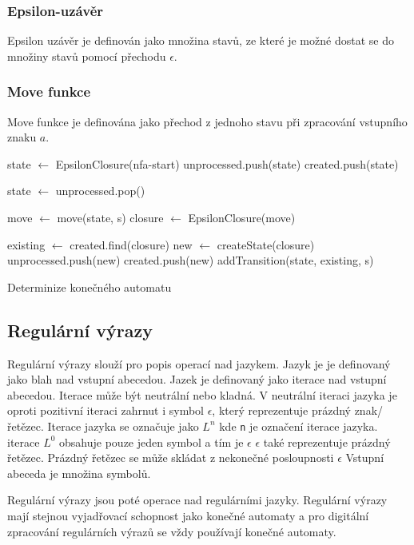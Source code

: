 \subsubsection{Epsilon-uzávěr} %
Epsilon uzávěr je definován jako množina stavů, ze které je možné dostat se do množiny stavů pomocí přechodu
$\epsilon$.

\subsubsection{Move funkce}
Move funkce je definována jako přechod z jednoho stavu při zpracování vstupního znaku $a$.

\begin{algorithm}[H]
	\label{alg:determinization}
	state $\leftarrow$ EpsilonClosure(nfa-start)\;
	unprocessed.push(state)\;
	created.push(state)\;
	{
		state $\leftarrow$ unprocessed.pop()\;
		{
			move $\leftarrow$  move(state, s)\;
			closure $\leftarrow$  EpsilonClosure(move)\;

			existing $\leftarrow$ created.find(closure)\;
			{
				new $\leftarrow$ createState(closure)\;
				unprocessed.push(new)\;
				created.push(new)\;
			}
			\lElse
			{
				addTransition(state, existing, s)\;
			}
		}
	}
	\caption{Determinize konečného automatu}
\end{algorithm}

\subsection{Regulární výrazy}

Regulární výrazy slouží pro popis operací nad jazykem.
Jazyk je je definovaný jako blah nad vstupní abecedou.
Jazek je definovaný jako iterace nad vstupní abecedou.
Iterace může  být neutrální nebo kladná.
V neutrální iteraci jazyka je oproti pozitivní iteraci zahrnut i symbol $\epsilon$,
který reprezentuje prázdný znak/řetězec.
Iterace jazyka se označuje jako $L^n$ kde \texttt{n} je označení iterace jazyka.
iterace $L^0$ obsahuje pouze jeden symbol a tím je $\epsilon$
$\epsilon$ také reprezentuje prázdný řetězec. Prázdný řetězec se může skládat z nekonečné posloupnosti $\epsilon$
Vstupní abeceda je množina symbolů.

Regulární výrazy jsou poté operace nad regulárními jazyky.
Regulární výrazy mají stejnou  vyjadřovací schopnost jako konečné automaty a pro digitální zpracování
regulárních výrazů se vždy používají konečné automaty.

